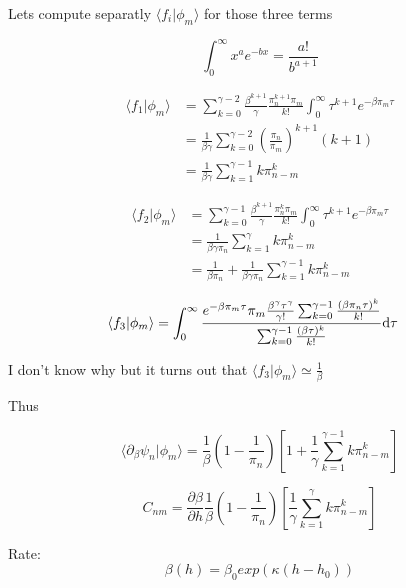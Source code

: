 \documentclass[a4paper,12pt,twoside]{article}
\def \dd  {{\rm d}}
\begin{document}
Lets compute separatly $\langle f_i|\phi_m \rangle$  for those three terms

\begin{equation}
\label{eq:integrale}
\int_0^\infty x^a e^{-bx}=\frac{a!}{b^{a+1}}
\end{equation}


\begin{align}
\langle f_1|\phi_m \rangle&=\sum_{k=0}^{\gamma-2}\frac{\beta^{k+1}}{\gamma}\frac{\pi_n^{k+1}\pi_m}{k!}\int^\infty_0\tau^{k+1}e^{-\beta\pi_m\tau}\\
&=\frac{1}{\beta\gamma}\sum_{k=0}^{\gamma-2}(\frac{\pi_n}{\pi_m})^{k+1}(k+1)\\
&=\frac{1}{\beta\gamma}\sum_{k=1}^{\gamma-1}k\pi_{n-m}^{k}
\end{align}

\begin{align}
\langle f_2|\phi_m \rangle&=\sum_{k=0}^{\gamma-1}\frac{\beta^{k+1}}{\gamma}\frac{\pi_n^{k}\pi_m}{k!}\int^\infty_0\tau^{k+1}e^{-\beta\pi_m\tau}\\
&=\frac{1}{\beta\gamma\pi_n}\sum_{k=1}^{\gamma}k\pi_{n-m}^{k}\\
&=\frac{1}{\beta\pi_n}+\frac{1}{\beta\gamma\pi_n}\sum_{k=1}^{\gamma-1}k\pi_{n-m}^{k}
\end{align}


\begin{align}
\langle f_3|\phi_m \rangle&=\int_0^\infty\frac{e^{-\beta\pi_m\tau}\pi_m\frac{\beta^{\gamma}\tau^\gamma}{\gamma!}\sum_{k=0}^{\gamma-1}\frac{(\beta\pi_n\tau)^k}{k!}}{\sum_{k=0}^{\gamma-1}\frac{(\beta\tau)^k}{k!}}\dd \tau
\end{align}

I don't know why but it turns out that 
$\langle f_3|\phi_m \rangle\simeq \frac{1}{\beta}$

Thus 

\begin{equation}
\langle\partial_\beta\psi_n|\phi_m \rangle =\frac{1}{\beta}(1-\frac{1}{\pi_{n}})[1+\frac{1}{\gamma}\sum_{k=1}^{\gamma-1}k\pi_{n-m}^{k}]
\end{equation}

\begin{equation}
\label{eq:cnm}
C_{nm}=\frac{\partial \beta}{\partial h}\frac{1}{\beta}(1-\frac{1}{\pi_{n}})[\frac{1}{\gamma}\sum_{k=1}^{\gamma}k\pi_{n-m}^{k}]
\end{equation}

Rate:
\begin{equation}
\beta(h)=\beta_0 exp(\kappa(h-h_0))
\end{equation}
\end{document}
